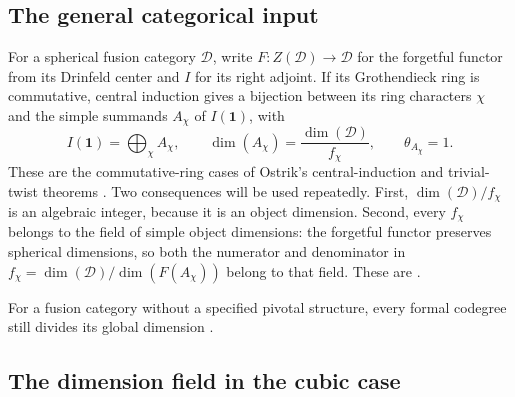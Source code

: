 \documentclass[11pt,a4paper]{article}
\theoremstyle{definition}
\theoremstyle{remark}
\newcommand{\cD}{\mathcal D}
\newcommand{\one}{\mathbf 1}
\numberwithin{equation}{section}
\begin{document}
\subsection{The general categorical input}

For a spherical fusion category $\cD$, write $F:Z(\cD)\to\cD$
for the forgetful functor from its Drinfeld center and $I$ for its right adjoint. If its
Grothendieck ring is commutative, central induction gives a bijection between its ring characters
$\chi$ and the simple summands $A_\chi$ of $I(\one)$, with
\begin{equation}\label{eq:induction-codegrees}
 I(\one)=\bigoplus_\chi A_\chi,\qquad
 \dim(A_\chi)=\frac{\dim(\cD)}{f_\chi},\qquad
 \theta_{A_\chi}=1.
\end{equation}
These are the commutative-ring cases of Ostrik's central-induction
and trivial-twist theorems \cite[Theorems~2.5 and~2.13]{Ostrik}.
Two consequences will be used repeatedly. First,
$\dim(\cD)/f_\chi$ is an algebraic integer, because it is an object
dimension. Second, every $f_\chi$ belongs to the field of simple
object dimensions: the forgetful functor preserves spherical dimensions,
so both the numerator and denominator in
$f_\chi=\dim(\cD)/\dim(F(A_\chi))$ belong to that field.
These are \cite[Corollaries~2.14--2.15]{Ostrik}.

For a fusion category without a specified pivotal structure, every
formal codegree still divides its global dimension
\cite[Corollary~2.14]{Ostrik}.

\subsection{The dimension field in the cubic case}
\end{document}
